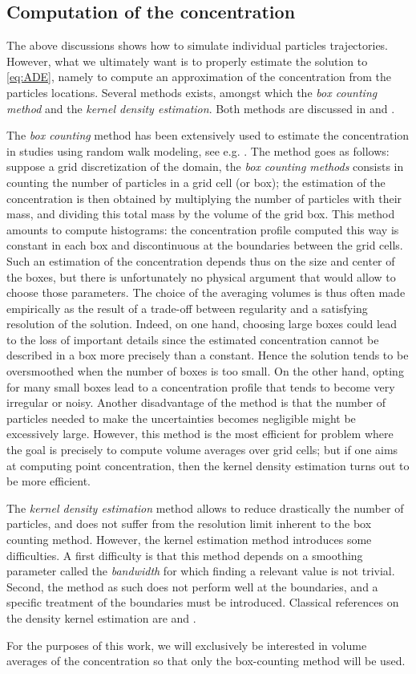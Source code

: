 \subsection{Computation of the concentration} \label{boxcounting_kernel}
The above discussions shows how to simulate individual particles trajectories. However, what we ultimately want is to properly estimate the solution to \eqref{eq:ADE}, namely to compute an approximation of the concentration from the particles locations. Several methods exists, amongst which the \textit{box counting method} and the \textit{kernel density estimation}. Both methods are discussed in \cite{spivakovskaya2007lagrangian} and \cite{dehaan1999densitykernel}.

The \textit{box counting} method has been extensively used to estimate the concentration in studies using random walk modeling, see e.g. \cite{riddle1998specification}. The method goes as follows: suppose a grid discretization of the domain, the \textit{box counting methods} consists in counting the number of particles in a grid cell (or box); the estimation of the concentration is then obtained by multiplying the number of particles with their mass, and dividing this total mass by the volume of the grid box. This method amounts to compute histograms: the concentration profile computed this way is constant in each box and discontinuous at the boundaries between the grid cells. Such an estimation of the concentration depends thus on the size and center of the boxes, but there is unfortunately no physical argument that would allow to choose those parameters. The choice of the averaging volumes is thus often made empirically as the result of a trade-off between regularity and a satisfying resolution of the solution. Indeed, on one hand, choosing large boxes could lead to the loss of important details since the estimated concentration cannot be described in a box more precisely than a constant. Hence the solution tends to be oversmoothed when the number of boxes is too small. On the other hand, opting for many small boxes lead to a concentration profile that tends to become very irregular or noisy. Another disadvantage of the method is that the number of particles needed to make the uncertainties becomes negligible might be excessively large. However, this method is the most efficient for problem where the goal is precisely to compute volume averages over grid cells; but if one aims at computing point concentration, then the kernel density estimation turns out to be more efficient.

The \textit{kernel density estimation} method allows to reduce drastically the number of particles, and does not suffer from the resolution limit inherent to the box counting method. However, the kernel estimation method introduces some difficulties. A first difficulty is that this method depends on a smoothing parameter called the \textit{bandwidth} for which finding a relevant value is not trivial. Second, the method as such does not perform well at the boundaries, and a specific treatment of the boundaries must be introduced. Classical references on the density kernel estimation are \cite{silverman1986density} and \cite{wand1995kernel}.

For the purposes of this work, we will exclusively be interested in volume averages of the concentration so that only the box-counting method will be used.